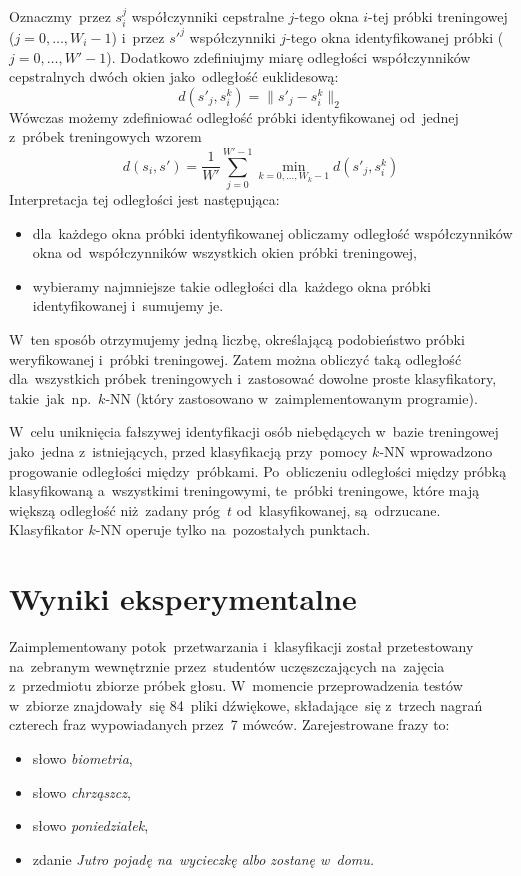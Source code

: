 \documentclass[11pt,a4paper]{article}
\begin{document}
Oznaczmy~przez $s_i^j$ współczynniki cepstralne $j$-tego okna $i$-tej próbki treningowej ($j = 0, \dots, W_i - 1$) i~przez $s'^j$ współczynniki $j$-tego okna identyfikowanej próbki ($j = 0, \dots, W' - 1$).
Dodatkowo zdefiniujmy miarę odległości współczynników cepstralnych dwóch okien jako~odległość euklidesową:
$$ d(s'_j, s_i^k) = \lVert s'_j - s_i^k \rVert_2 $$
Wówczas możemy zdefiniować odległość próbki identyfikowanej od~jednej z~próbek treningowych wzorem
$$ d(s_i, s') = \frac{1}{W'} \sum_{j=0}^{W' - 1} \min_{k=0, \dots, W_k - 1} d(s'_j, s_i^k) $$
Interpretacja tej odległości jest następująca:
\begin{itemize}
    \item dla~każdego okna próbki identyfikowanej obliczamy odległość współczynników okna od~współczynników wszystkich okien próbki treningowej,
    \item wybieramy najmniejsze takie odległości dla~każdego okna próbki identyfikowanej i~sumujemy je.
\end{itemize}
W~ten sposób otrzymujemy jedną liczbę, określającą podobieństwo próbki weryfikowanej i~próbki treningowej.
Zatem można obliczyć taką odległość dla~wszystkich próbek treningowych i~zastosować dowolne proste klasyfikatory, takie~jak~np.~$k$-NN (który zastosowano w~zaimplementowanym programie).

W~celu uniknięcia fałszywej identyfikacji osób niebędących w~bazie treningowej jako~jedna z~istniejących, przed klasyfikacją przy~pomocy $k$-NN wprowadzono progowanie odległości między~próbkami.
Po~obliczeniu odległości między próbką klasyfikowaną a~wszystkimi treningowymi, te~próbki treningowe, które mają większą odległość niż~zadany próg~$t$ od~klasyfikowanej, są~odrzucane.
Klasyfikator $k$-NN operuje tylko na~pozostałych punktach.

\section{Wyniki eksperymentalne}
\label{sec:results}

Zaimplementowany potok~przetwarzania i~klasyfikacji został przetestowany na~zebranym wewnętrznie przez~studentów uczęszczających na~zajęcia z~przedmiotu zbiorze próbek głosu.
W~momencie przeprowadzenia testów w~zbiorze znajdowały~się 84~pliki dźwiękowe, składające~się z~trzech nagrań czterech fraz wypowiadanych przez~7 mówców.
Zarejestrowane frazy to:
\begin{itemize}
    \item słowo \emph{biometria},
    \item słowo \emph{chrząszcz},
    \item słowo \emph{poniedziałek},
    \item zdanie \emph{Jutro pojadę na~wycieczkę albo zostanę w~domu.}
\end{itemize}
\end{document}
